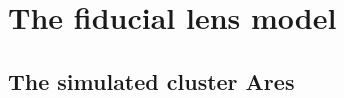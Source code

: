 %

\section{The fiducial lens model}
\label{chap3:sec:lens_model}

\subsection{The simulated cluster Ares}
\label{chap3:sec:ares}

